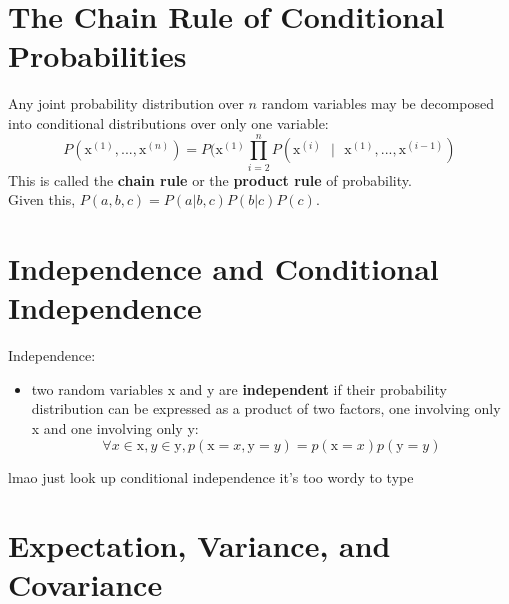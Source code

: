\documentclass[11pt, twocolumn]{report}
\begin{document}
\section{The Chain Rule of Conditional Probabilities}
Any joint probability distribution over $n$ random variables may be decomposed
into conditional distributions over only one variable:
\begin{equation}
  P(\text{x}^{(1)},...,\text{x}^{(n)}) = P(\text{x}^{(1)} \prod_{i = 2}^{n}
  P(\text{x}^{(i)} \text{ } | \text{ } \text{x}^{(1)},..., \text{x}^{(i-1)})
\end{equation}
This is called the \textbf{chain rule} or the \textbf{product rule} of
probability.\\
Given this, $P(a, b, c) = P(a | b,c)P(b|c)P(c)$.

\section{Independence and Conditional Independence}
Independence:
\begin{itemize}
  \item two random variables x and y are \textbf{independent} if their
    probability distribution can be expressed as a product of two factors, one
    involving only x and one involving only y:
    \begin{equation}
      \forall x \in \text{x}, y \in \text{y}, p(\text{x} = x, \text{y} = y) =
      p(\text{x} = x)p(\text{y} = y)
    \end{equation}
\end{itemize}
lmao just look up conditional independence it's too wordy to type

\section{Expectation, Variance, and Covariance}
\end{document}
